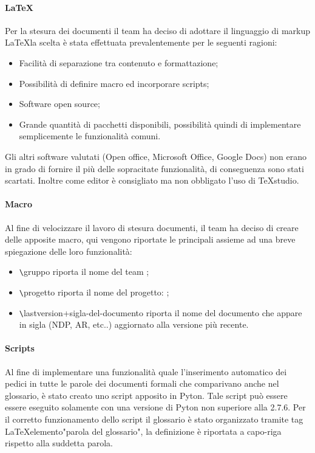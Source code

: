 \paragraph{LaTeX}
Per la stesura dei documenti il team \gruppo{} ha deciso di adottare il linguaggio di markup \LaTeX la scelta è stata effettuata prevalentemente per le seguenti ragioni:
\begin{itemize}
\item Facilità di separazione tra contenuto
e formattazione;
\item Possibilità di definire macro ed incorporare scripts;
\item Software open source;
\item Grande quantità di pacchetti disponibili, possibilità quindi di implementare semplicemente le funzionalità comuni.
\end{itemize}
Gli altri software valutati (Open office, Microsoft Office, Google Docs) non erano in grado di fornire il più delle sopracitate funzionalità, di conseguenza sono stati scartati. Inoltre come editor è consigliato ma non obbligato l'uso di TeXstudio.

\paragraph{Macro}
Al fine di velocizzare il lavoro di stesura documenti, il team \gruppo{} ha deciso di creare delle apposite macro, qui vengono riportate le principali assieme ad una breve spiegazione delle loro funzionalità:
\begin{itemize}
\item \verb+\+gruppo riporta il nome del team \gruppo;
\item \verb+\+progetto riporta il nome del progetto: \progetto;
\item \verb+\+lastversion+sigla-del-documento riporta il nome del documento che appare in sigla (NDP, AR, etc..) aggiornato alla versione più recente.

\end{itemize}
\paragraph{Scripts}
Al fine di implementare una funzionalità quale l'inserimento automatico dei pedici in tutte le parole dei documenti formali che comparivano anche nel glossario, è stato creato uno script apposito in Pyton. Tale script può essere essere eseguito solamente con una versione di Pyton non superiore alla 2.7.6.
Per il corretto funzionamento dello script il glossario è stato organizzato tramite tag \LaTeX elemento{"parola del glossario"}, la definizione è riportata a capo-riga rispetto alla suddetta parola. 

